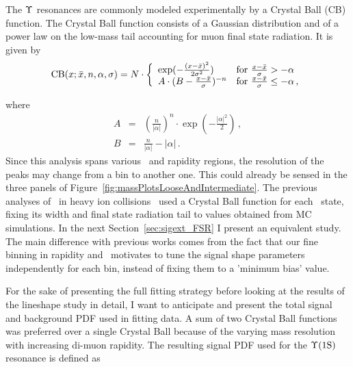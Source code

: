 The $\Upsilon$ resonances are commonly modeled experimentally by a Crystal Ball (CB) function.
The Crystal Ball function consists of a Gaussian distribution and of a power law on the
low-mass tail accounting for muon final state radiation. It is given by
\begin{equation} \label{CrystalBall}
  {\rm CB}(x;\bar x,n,\alpha,\sigma) = N \cdot \left\{
  \begin{array}{ll}
    \exp(- \frac{(x -\bar x)^2}{2 \sigma^2})      & \mbox{for } \frac{x - \bar x}{\sigma} > -\alpha \\
    A \cdot (B - \frac{x - \bar x}{\sigma})^{-n}  & \mbox{for } \frac{x - \bar x}{\sigma} \leq -\alpha \,,
  \end{array}
  \right.
\end{equation}

where
\begin{eqnarray}
  A & = & \left(\frac{n}{\left| \alpha \right|}\right)^n \cdot \exp\left(- \frac {\left| \alpha \right|^2}{2}\right) \,, \nonumber \\
  B & = & \frac{n}{\left| \alpha \right|} - \left| \alpha \right| \,. \nonumber
\end{eqnarray}
Since this analysis spans various \pt\ and rapidity regions, the
resolution of the peaks may change from a bin to another one. This could
already be sensed in the three panels
of Figure~\ref{fig:massPlotsLooseAndIntermediate}. The previous analyses
of \PgU\ in heavy ion collisions~\cite{torsten,HIN-11-007,11-011} used a Crystal
Ball function for each \PgU\ state, fixing its width and final state
radiation tail to values obtained from MC simulations. In the next
Section~\ref{sec:sigext_FSR} I present an equivalent study. The main difference with
previous works comes from the fact that our fine binning in
rapidity and \pt\ motivates to tune the signal shape parameters
independently for each bin, instead of fixing them to a 'minimum bias'
value.


For the sake of presenting the full fitting strategy before looking at the
results of the lineshape study in detail, I want to anticipate and
present the total signal and background PDF used in fitting data. A sum of two Crystal Ball functions was preferred over a single
Crystal Ball %
because of the varying mass resolution with increasing
di-muon rapidity. The resulting signal PDF used for the  $\Upsilon\mathrm{(1S)}$ resonance
is defined as


